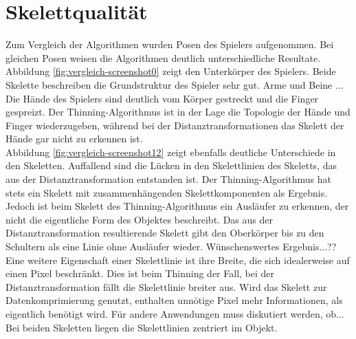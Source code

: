 \section{Skelettqualität} %
Zum Vergleich der Algorithmen wurden Posen des Spielers aufgenommen. Bei gleichen Posen
weisen die Algorithmen deutlich unterschiedliche Resultate. Abbildung \ref{fig:vergleich-screenshot0} zeigt
den Unterkörper des Spielers. Beide Skelette beschreiben die Grundstruktur des Spieler sehr gut. Arme und Beine ... \\ Die Hände des Spielers sind deutlich vom Körper gestreckt und die Finger gespreizt. Der Thinning-Algorithmus ist in der Lage die Topologie der Hände und Finger wiederzugeben, während bei der
Distanztransformationen das Skelett der Hände gar nicht zu erkennen ist. \\
Abbildung \ref{fig:vergleich-screenshot12} zeigt ebenfalls deutliche Unterschiede in den Skeletten. Auffallend sind die Lücken in den Skelettlinien des Skeletts, das aus der Distanztransformation entstanden 
ist. Der Thinning-Algorithmus hat stets ein Skelett mit zusammenhängenden Skelettkomponenten als Ergebnis. 
Jedoch ist beim Skelett des Thinning-Algorithmus ein Ausläufer zu erkennen, der nicht die eigentliche Form
des Objektes beschreibt. Das aus der Distanztransformation resultierende Skelett gibt den Oberkörper bis
zu den Schultern als eine Linie ohne Ausläufer wieder. Wünschenswertes Ergebnis...??\\
Eine weitere Eigenschaft einer Skelettlinie ist ihre Breite, die sich idealerweise auf einen Pixel beschränkt. Dies ist beim Thinning der Fall, bei der Distanztransformation fällt die Skelettlinie breiter
aus. Wird das Skelett zur Datenkomprimierung genutzt, enthalten unnötige Pixel mehr Informationen, als 
eigentlich benötigt wird. Für andere Anwendungen muss diskutiert werden, ob...\\
Bei beiden Skeletten liegen die Skelettlinien zentriert im Objekt. 
